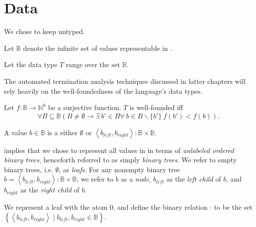 \section{Data}

We chose to keep \D{} untyped.

\begin{definition} Let $\mathbb{B}$ denote the infinite set of values
representable in \D{}.\end{definition}

\begin{definition} Let the data type $T$ range over the set
$\mathbb{B}$.\end{definition}

The automated termination analysis techniques discussed in latter chapters will
rely heavily on the well-foundedness of the language's data types.

\begin{definition}\label{definition:well-foundedness} Let
$f:\mathbb{B}\rightarrow \mathbb{N}^0$ be a surjective function. $T$ is
well-founded iff $$\forall B\subseteq \mathbb{B} \left( B \neq \emptyset
\rightarrow \exists\ b' \in B \forall\ b\in B\backslash\{b'\}\ f(b') < f(b)
\right).$$\end{definition}

\begin{definition}\label{definition:values} A value $b\in\mathbb{B}$ is a
either $\emptyset$ or $\left\langle b_{left},b_{right} \right\rangle :
\mathbb{B} \times \mathbb{B}$.\end{definition}

 implies that we chose to represent all values in
\D{} in terms of \emph{unlabeled ordered binary trees}, henceforth referred to
as simply \emph{binary trees}.  We refer to empty binary trees, i.e.
$\emptyset$, as \emph{leafs}. For any nonempty binary tree $b= \left\langle
b_{left},b_{right} \right\rangle : \mathbb{B} \times \mathbb{B}$, we refer to
$b$ as a \emph{node}, $b_{left}$ as the \emph{left child} of $b$, and
$b_{right}$ as the \emph{right child} of $b$.

\begin{definition}\label{definition:value-leaf} We represent a leaf with the
atom $0$, and define the binary relation $\cdot$ to be the set\\ $\left\{
\left\langle b_{left},b_{right} \right\rangle \mid b_{left}, b_{right}
\in\mathbb{B} \right\}$.\end{definition}

